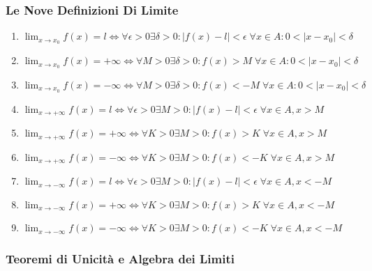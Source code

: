 \subsubsection{Le Nove Definizioni Di Limite}

\begin{enumerate}
    \item \(\lim_{ x \to x_{0} } f(x)=l \iff \forall \epsilon > 0 \exists \delta > 0 : |f(x)-l|<\epsilon \; \forall x \in A : 0 < |x -x_{0}| < \delta\)
    \item \(\lim_{ x \to x_{0} } f(x)=+\infty \iff \forall M > 0 \exists \delta > 0 : f(x)>M\; \forall x \in A : 0 < |x -x_{0}| < \delta\)
    \item \(\lim_{ x \to x_{0} } f(x)=-\infty \iff \forall M > 0 \exists \delta > 0 : f(x)<-M\; \forall x \in A : 0 < |x -x_{0}| < \delta\)
    \item \(\lim_{ x \to +\infty } f(x)=l \iff \forall \epsilon>0 \exists M>0 : |f(x)-l|<\epsilon\; \forall x \in A , x>M\)
    \item \(\lim_{ x \to +\infty } f(x)=+\infty \iff \forall K>0 \exists M>0 : f(x)>K \; \forall x \in A , x>M\)
    \item \(\lim_{ x \to +\infty } f(x)=-\infty \iff \forall K>0 \exists M>0 : f(x)<-K \; \forall x \in A , x>M\)
    \item \(\lim_{ x \to -\infty } f(x)=l \iff \forall \epsilon>0 \exists M>0 : |f(x)-l|<\epsilon\; \forall x \in A , x<-M\)
    \item \(\lim_{ x \to -\infty } f(x)=+\infty \iff \forall K>0 \exists M>0 : f(x)>K \; \forall x \in A , x<-M\)
    \item \(\lim_{ x \to -\infty } f(x)=-\infty \iff \forall K>0 \exists M>0 : f(x)<-K \; \forall x \in A , x<-M\)
\end{enumerate}

\subsubsection{Teoremi di Unicità e Algebra dei Limiti}



